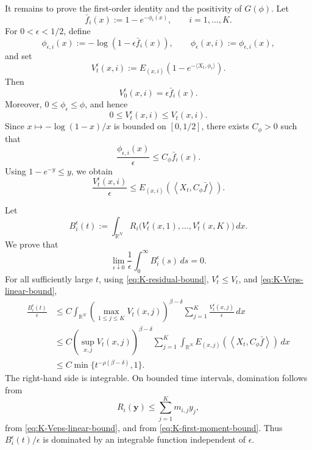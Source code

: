 \documentclass[reqno,final,11pt]{amsart}
\newcommand{\1}{\mathbbm{1}}
\theoremstyle{plain}
\theoremstyle{definition}
\theoremstyle{remark}
\begin{document}
It remains to prove the first-order identity and the positivity of \(G(\phi)\). Let
\[
\bar f_i(x):=1-e^{-\phi_i(x)},
\qquad i=1,\dots,K.
\]
For \(0<\epsilon<1/2\), define
\[
\phi_{\epsilon,i}(x):=-\log(1-\epsilon\bar f_i(x)),
\qquad
\phi_\epsilon(x,i):=\phi_{\epsilon,i}(x),
\]
and set
\[
V_t^\epsilon(x,i)
:=
E_{(x,i)}
\left(
1-e^{-\langle X_t,\phi_\epsilon\rangle}
\right).
\]
Then
\[
V_0^\epsilon(x,i)=\epsilon\bar f_i(x).
\]
Moreover, \(0\le \phi_\epsilon\le\phi\), and hence
\[
0\le V_t^\epsilon(x,i)\le V_t(x,i).
\]
Since \(x\mapsto-\log(1-x)/x\) is bounded on \([0,1/2]\), there exists
\(C_\phi>0\) such that
\[
\frac{\phi_{\epsilon,i}(x)}{\epsilon}
\le
C_\phi\bar f_i(x).
\]
Using \(1-e^{-y}\le y\), we obtain
\begin{equation}\label{eq:K-Veps-linear-bound}
\frac{V_t^\epsilon(x,i)}{\epsilon}
\le
E_{(x,i)}
\left(
\left\langle X_t,C_\phi\bar f\right\rangle
\right).
\end{equation}

Let
\[
B_i^\epsilon(t)
:=
\int_{\mathbb R^N}
R_i\bigl(V_t^\epsilon(x,1),\dots,V_t^\epsilon(x,K)\bigr)\,dx.
\]
We prove that
\begin{equation}\label{eq:K-Beps-zero}
\lim_{\epsilon\downarrow0}
\frac1\epsilon
\int_0^\infty B_i^\epsilon(s)\,ds
=
0.
\end{equation}
For all sufficiently large \(t\), using \eqref{eq:K-residual-bound},
\(V_t^\epsilon\le V_t\), and \eqref{eq:K-Veps-linear-bound},
\[
\begin{split}
\frac{B_i^\epsilon(t)}{\epsilon}
&\le
C
\int_{\mathbb R^N}
\left(\max_{1\le j\le K}V_t(x,j)\right)^{\beta-\delta}
\sum_{j=1}^K\frac{V_t^\epsilon(x,j)}{\epsilon}\,dx
\\
&\le
C
\left(\sup_{x,j}V_t(x,j)\right)^{\beta-\delta}
\sum_{j=1}^K
\int_{\mathbb R^N}
E_{(x,j)}
\left(
\left\langle X_t,C_\phi\bar f\right\rangle
\right)\,dx
\\
&\le
C\min\{t^{-\rho(\beta-\delta)},1\}.
\end{split}
\]
The right-hand side is integrable. On bounded time intervals, domination follows from
\[
R_i(\mathbf y)\le\sum_{j=1}^K m_{i,j}y_j,
\]
from \eqref{eq:K-Veps-linear-bound}, and from \eqref{eq:K-first-moment-bound}. Thus
\(B_i^\epsilon(t)/\epsilon\) is dominated by an integrable function independent of
\(\epsilon\).
\end{document}
